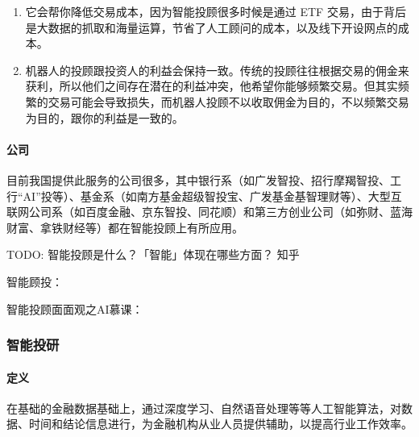 \documentclass[letterpaper,11pt,english]{sphinxmanual}
\begin{document}
\begin{center}
{{\begin{enumerate}
\item {} 
它会帮你降低交易成本，因为智能投顾很多时候是通过 ETF
交易，由于背后是大数据的抓取和海量运算，节省了人工顾问的成本，以及线下开设网点的成本。

\item {} 
机器人的投顾跟投资人的利益会保持一致。传统的投顾往往根据交易的佣金来获利，所以他们之间存在潜在的利益冲突，他希望你能够频繁交易。但其实频繁的交易可能会导致损失，而机器人投顾不以收取佣金为目的，不以频繁交易为目的，跟你的利益是一致的。

\end{enumerate}


\paragraph{公司}
\label{\detokenize{chapter_AI+Finance/Robo-Advisor:id8}}
目前我国提供此服务的公司很多，其中银行系（如广发智投、招行摩羯智投、工行“AI”投等）、基金系（如南方基金超级智投宝、广发基金基智理财等）、大型互联网公司系（如百度金融、京东智投、同花顺）和第三方创业公司（如弥财、蓝海财富、拿铁财经等）都在智能投顾上有所应用。%
\begin{footnote}[963]\sphinxAtStartFootnote
{}
%
\end{footnote}

TODO: 智能投顾是什么？「智能」体现在哪些方面？ \sphinxhyphen{} 知乎

智能顾投： 

智能投顾面面观之AI慕课： 


\subsubsection{智能投研}
\label{\detokenize{chapter_AI+Finance/AI_Investment_Research:id1}}\label{\detokenize{chapter_AI+Finance/AI_Investment_Research::doc}}

\paragraph{定义}
\label{\detokenize{chapter_AI+Finance/AI_Investment_Research:id2}}
在基础的金融数据基础上，通过深度学习、自然语音处理等等人工智能算法，对数据、时间和结论信息进行，为金融机构从业人员提供辅助，以提高行业工作效率。%
\begin{footnote}[964]\sphinxAtStartFootnote
{}
%
\end{footnote}


}}
\end{center}
\end{document}
